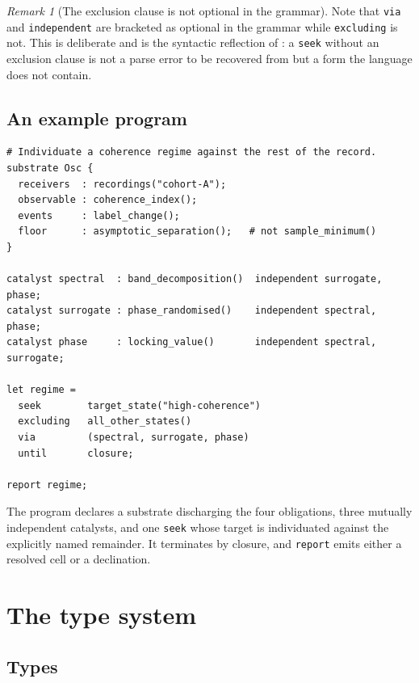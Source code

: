 \documentclass[11pt,a4paper]{article}
\theoremstyle{thmstyle}
\theoremstyle{definition}
\theoremstyle{remark}
\newtheorem{remark}[theorem]{Remark}
\begin{document}
\begin{remark}[The exclusion clause is not optional in the grammar]
\label{rem:excl-grammar}
Note that \texttt{via} and \texttt{independent} are bracketed as optional in
the grammar while \texttt{excluding} is not. This is deliberate and is the
syntactic reflection of : a \texttt{seek}
without an exclusion clause is not a parse error to be recovered from but a
form the language does not contain.
\end{remark}

\subsection{An example program}

\begin{lstlisting}[style=mckstyle]
# Individuate a coherence regime against the rest of the record.
substrate Osc {
  receivers  : recordings("cohort-A");
  observable : coherence_index();
  events     : label_change();
  floor      : asymptotic_separation();   # not sample_minimum()
}

catalyst spectral  : band_decomposition()  independent surrogate, phase;
catalyst surrogate : phase_randomised()    independent spectral, phase;
catalyst phase     : locking_value()       independent spectral, surrogate;

let regime =
  seek        target_state("high-coherence")
  excluding   all_other_states()
  via         (spectral, surrogate, phase)
  until       closure;

report regime;
\end{lstlisting}

The program declares a substrate discharging the four obligations, three
mutually independent catalysts, and one \texttt{seek} whose target is
individuated against the explicitly named remainder. It terminates by
closure, and \texttt{report} emits either a resolved cell or a declination.

\section{The type system}
\label{sec:typing}

\subsection{Types}
\end{document}
